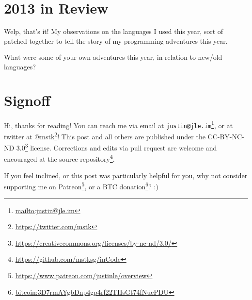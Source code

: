 \documentclass[]{article}
\renewcommand{\href}[2]{#2\footnote{\url{#1}}}
\begin{document}
\hypertarget{in-review}{%
\section{2013 in Review}\label{in-review}}

Welp, that's it! My observations on the languages I used this year, sort of
patched together to tell the story of my programming adventures this year.

What were some of your own adventures this year, in relation to new/old
languages?

\hypertarget{signoff}{%
\section{Signoff}\label{signoff}}

Hi, thanks for reading! You can reach me via email at
\href{mailto:justin@jle.im}{\nolinkurl{justin@jle.im}}, or at twitter at
\href{https://twitter.com/mstk}{@mstk}! This post and all others are published
under the \href{https://creativecommons.org/licenses/by-nc-nd/3.0/}{CC-BY-NC-ND
3.0} license. Corrections and edits via pull request are welcome and encouraged
at \href{https://github.com/mstksg/inCode}{the source repository}.

If you feel inclined, or this post was particularly helpful for you, why not
consider \href{https://www.patreon.com/justinle/overview}{supporting me on
Patreon}, or a \href{bitcoin:3D7rmAYgbDnp4gp4rf22THsGt74fNucPDU}{BTC donation}?
:)
\end{document}

